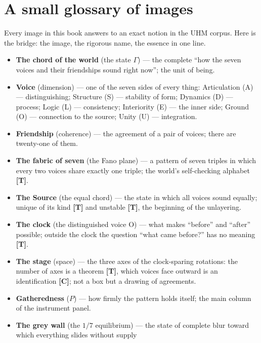 \documentclass[11pt,letterpaper]{article}
\newcommand{\stT}{\textbf{[T]}\xspace}
\newcommand{\stC}{\textbf{[C]}\xspace}
\begin{document}
\section*{A small glossary of images}

Every image in this book answers to an exact notion in the UHM
corpus. Here is the bridge: the image, the rigorous name, the
essence in one line.

\begin{itemize}[leftmargin=1.4em, itemsep=1pt, parsep=0pt]
  \item \textbf{The chord of the world} (the state $\Gamma$) --- the
    complete ``how the seven voices and their friendships sound
    right now''; the unit of being.
  \item \textbf{Voice} (dimension) --- one of the seven sides of
    every thing: Articulation (A) --- distinguishing; Structure (S)
    --- stability of form; Dynamics (D) --- process; Logic (L) ---
    consistency; Interiority (E) --- the inner side; Ground (O) ---
    connection to the source; Unity (U) --- integration.
  \item \textbf{Friendship} (coherence) --- the agreement of a pair
    of voices; there are twenty-one of them.
  \item \textbf{The fabric of seven} (the Fano plane) --- a pattern
    of seven triples in which every two voices share exactly one
    triple; the world's self-checking alphabet \stT.
  \item \textbf{The Source} (the equal chord) --- the state in which
    all voices sound equally; unique of its kind \stT{} and
    unstable \stT, the beginning of the unlayering.
  \item \textbf{The clock} (the distinguished voice O) --- what
    makes ``before'' and ``after'' possible; outside the clock the
    question ``what came before?'' has no meaning \stT.
  \item \textbf{The stage} (space) --- the three axes of the
    clock-sparing rotations: the number of axes is a theorem \stT,
    which voices face outward is an identification \stC; not a box
    but a drawing of agreements.
  \item \textbf{Gatheredness} ($P$) --- how firmly the pattern holds
    itself; the main column of the instrument panel.
  \item \textbf{The grey wall} (the $1/7$ equilibrium) --- the state
    of complete blur toward which everything slides without supply

\end{itemize}
\end{document}

